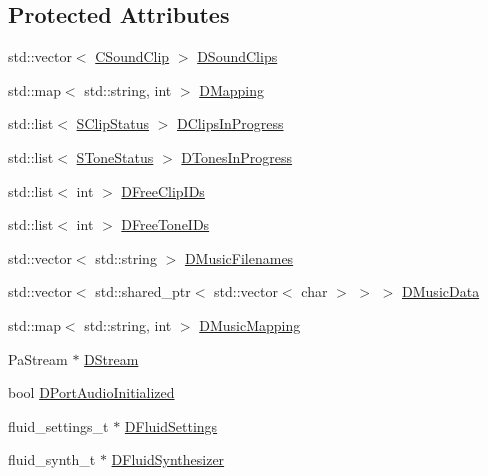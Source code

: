 \subsection*{Protected Attributes}
\begin{DoxyCompactItemize}
\item 
std\+::vector$<$ \hyperlink{classCSoundClip}{C\+Sound\+Clip} $>$ \hyperlink{classCSoundLibraryMixer_af4a006eacdcd590fad6e02cddaf197c2}{D\+Sound\+Clips}
\item 
std\+::map$<$ std\+::string, int $>$ \hyperlink{classCSoundLibraryMixer_a8f193156cafc61b64f04ed88dcabd27d}{D\+Mapping}
\item 
std\+::list$<$ \hyperlink{structCSoundLibraryMixer_1_1SClipStatus}{S\+Clip\+Status} $>$ \hyperlink{classCSoundLibraryMixer_aad014b54093b2aeee4d7014ab329dbf9}{D\+Clips\+In\+Progress}
\item 
std\+::list$<$ \hyperlink{structCSoundLibraryMixer_1_1SToneStatus}{S\+Tone\+Status} $>$ \hyperlink{classCSoundLibraryMixer_a39bb9c811d842a282b6b7058ac7dfe1c}{D\+Tones\+In\+Progress}
\item 
std\+::list$<$ int $>$ \hyperlink{classCSoundLibraryMixer_a32956ae09580a1ae4c9c037f0f7b5c0b}{D\+Free\+Clip\+I\+Ds}
\item 
std\+::list$<$ int $>$ \hyperlink{classCSoundLibraryMixer_a2d1389368651db10fd6fd8b3cd08c164}{D\+Free\+Tone\+I\+Ds}
\item 
std\+::vector$<$ std\+::string $>$ \hyperlink{classCSoundLibraryMixer_a105a9c5d911492518ac706039bf1de16}{D\+Music\+Filenames}
\item 
std\+::vector$<$ std\+::shared\+\_\+ptr$<$ std\+::vector$<$ char $>$ $>$ $>$ \hyperlink{classCSoundLibraryMixer_a494744db8ea800dd1443418711183846}{D\+Music\+Data}
\item 
std\+::map$<$ std\+::string, int $>$ \hyperlink{classCSoundLibraryMixer_ada2510450315651ebe948ce63960b98a}{D\+Music\+Mapping}
\item 
Pa\+Stream $\ast$ \hyperlink{classCSoundLibraryMixer_ad992cd6202130db3a45ca695eca34625}{D\+Stream}
\item 
bool \hyperlink{classCSoundLibraryMixer_a1c78419f5e6cfdf4bc879bb5eedf52f0}{D\+Port\+Audio\+Initialized}
\item 
fluid\+\_\+settings\+\_\+t $\ast$ \hyperlink{classCSoundLibraryMixer_a2c6fb394c8bed99adb019576dc7f6eee}{D\+Fluid\+Settings}
\item 
fluid\+\_\+synth\+\_\+t $\ast$ \hyperlink{classCSoundLibraryMixer_a6c1663c381dbf2aa18c82a23141f409c}{D\+Fluid\+Synthesizer}

\end{DoxyCompactItemize}
